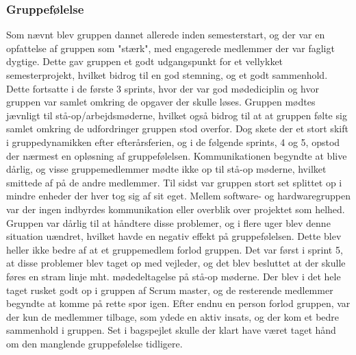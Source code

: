 \subsubsection{Gruppefølelse}
Som nævnt blev gruppen dannet allerede inden semesterstart, og der var en opfattelse af gruppen som "stærk", med engagerede medlemmer der var fagligt dygtige. 
Dette gav gruppen et godt udgangspunkt for et vellykket semesterprojekt, hvilket bidrog til en god stemning, og et godt sammenhold. Dette fortsatte i de første
 3 sprints, hvor der var god mødediciplin og hvor gruppen var samlet omkring de opgaver der skulle løses. Gruppen mødtes jævnligt til stå-op/arbejdsmøderne, 
 hvilket også bidrog til at at gruppen følte sig samlet omkring de udfordringer gruppen stod overfor. Dog skete 
der et 
stort skift i gruppedynamikken efter efterårsferien, og i de følgende sprints, 4 og 5, opstod der nærmest en opløsning af gruppefølelsen. Kommunikationen 
begyndte at blive dårlig, og visse gruppemedlemmer mødte ikke op til stå-op møderne, hvilket smittede af på de andre medlemmer. Til sidst var gruppen stort 
set splittet op i mindre enheder der hver tog sig af sit eget. Mellem software- og hardwaregruppen var der ingen 
indbyrdes kommunikation eller overblik over projektet som helhed. Gruppen var dårlig til at håndtere disse problemer, og i flere uger blev denne situation 
uændret, hvilket havde en negativ effekt på gruppefølelsen. Dette blev heller ikke bedre af at et gruppemedlem forlod gruppen. Det var først i sprint 5, at 
disse problemer blev taget op med vejleder, og det blev besluttet at der skulle føres en stram linje mht. mødedeltagelse på stå-op møderne. Der blev i det 
hele taget rusket godt op i gruppen af Scrum master, og de resterende medlemmer begyndte at komme på rette spor igen. Efter endnu en person forlod gruppen,
var der kun de medlemmer tilbage, som ydede en aktiv insats, og der kom et bedre sammenhold i gruppen. Set i bagspejlet skulle der klart have 
været taget hånd om den manglende gruppefølelse tidligere. 

